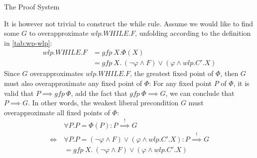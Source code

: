 \begin{table}[t]
  \normalsize
  \centering
  \caption{The Proof System}
  \label{tab:proof-system}
\end{table}

It is however not trivial to construct the while rule. 
Assume we would like to find some $G$ to overapproximate $wlp.WHILE.F$, unfolding according to the definition in \autoref{tab:wp-wlp}: 
\begin{align*}
	wlp.WHILE.F &= gfp\ X. \Phi(X)\\  
	&= gfp\ X.\ (\neg\varphi\wedge F)\vee(\varphi\wedge wlp.C'.X) 
\end{align*}
Since $G$ overapproximates $wlp.WHILE.F$, the greatest fixed point of $\Phi$, then $G$ must also overapproximate any fixed point of $\Phi$: 
For any fixed point $P$ of $\Phi$, it is valid that $P\implies gfp\ \Phi$, add the fact that $gfp\ \Phi\implies G$, we can conclude that $P\implies G$. 
In other words, the weakest liberal precondition $G$ must overapproximate all fixed points of $\Phi$: 
\begin{align*}
	&\forall P. P=\Phi(P): P\overset{!}{\implies} G\\  
	\Leftrightarrow \ &\forall P. P=(\neg\varphi\wedge F)\vee(\varphi\wedge wlp.C'.X): P\overset{!}{\implies} G\\  
	&= gfp\ X.\ (\neg\varphi\wedge F)\vee(\varphi\wedge wlp.C'.X) 
\end{align*}









